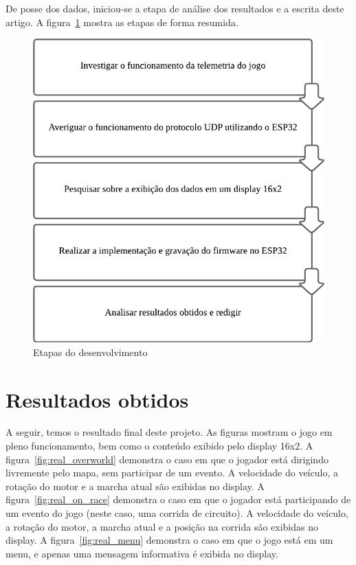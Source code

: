 \documentclass[12pt]{article}
\begin{document}
De posse dos dados, iniciou-se a etapa de análise dos resultados e
a escrita deste artigo. A figura~\ref{fig:development_fluxogram} mostra as etapas de forma resumida.

\begin{figure}[ht]
  \centering
  \includegraphics[width=.7\textwidth]{images/development_fluxogram.png}
  \caption{Etapas do desenvolvimento}
  \label{fig:development_fluxogram}
\end{figure}

\section{Resultados obtidos}

A seguir, temos o resultado final deste projeto.
As figuras mostram o jogo em pleno funcionamento, bem como o conteúdo
exibido pelo display 16x2. A figura~\ref{fig:real_overworld} demonstra o caso
em que o jogador está dirigindo livremente pelo mapa, sem participar de um evento.
A velocidade do veículo, a rotação do motor e a marcha atual são exibidas no display.
A figura~\ref{fig:real_on_race} demonstra o caso em que o jogador está participando de um
evento do jogo (neste caso, uma corrida de circuito).
A velocidade do veículo, a rotação do motor, a marcha atual e a posição na corrida são exibidas no display.
A figura~\ref{fig:real_menu} demonstra o caso em que o jogo está em um menu, e apenas uma mensagem
informativa é exibida no display.\clearpage
\end{document}
